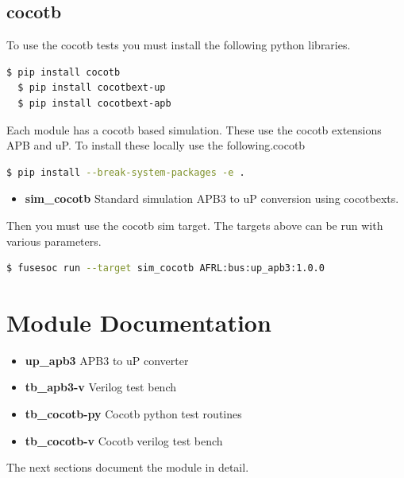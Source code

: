 \subsection{cocotb}
\par
To use the cocotb tests you must install the following python libraries.
\begin{lstlisting}[language=bash]
  $ pip install cocotb
  $ pip install cocotbext-up
  $ pip install cocotbext-apb
\end{lstlisting}

Each module has a cocotb based simulation. These use the cocotb extensions APB and uP. To install
these locally use the following.cocotb
\begin{lstlisting}[language=bash]
  $ pip install --break-system-packages -e .
\end{lstlisting}

\begin{itemize}
  \item \textbf{sim\_cocotb} Standard simulation APB3 to uP conversion using cocotbexts.
\end{itemize}

Then you must use the cocotb sim target. The targets above can be run with various parameters.
\begin{lstlisting}[language=bash]
  $ fusesoc run --target sim_cocotb AFRL:bus:up_apb3:1.0.0
\end{lstlisting}

\newpage

\section{Module Documentation} \label{Module Documentation}

\par

\begin{itemize}
\item \textbf{up\_apb3} APB3 to uP converter\\
\item \textbf{tb\_apb3-v} Verilog test bench\\
\item \textbf{tb\_cocotb-py} Cocotb python test routines\\
\item \textbf{tb\_cocotb-v} Cocotb verilog test bench\\
\end{itemize}
The next sections document the module in detail.

